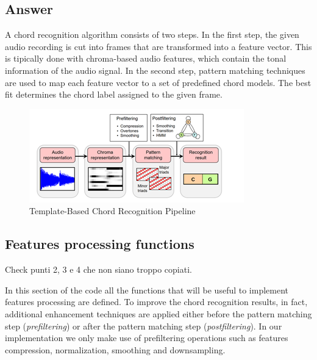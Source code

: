 \documentclass[
	12pt, %
]{fphw}
\begin{document}
\subsection*{\color{blue}Answer}

A chord recognition algorithm consists of two steps. In the first step, the given audio recording is cut into frames that are transformed into a feature vector. This is tipically done with chroma-based audio features, which contain the tonal information of the audio signal.
In the second step, pattern matching techniques are used to map each feature vector to a set of predefined chord models. The best fit determines the chord label assigned to the given frame.

\begin{figure}[H]
 \centering
 \includegraphics[scale=1]{./images/1_template_based_pipeline.png}
 \caption{Template-Based Chord Recognition Pipeline}
\end{figure}


\subsection*{Features processing functions}

\color{red}
Check punti 2, 3 e 4 che non siano troppo copiati.
\color{black}

In this section of the code all the functions that will be useful to implement features processing are defined. To improve the chord recognition results, in fact, additional enhancement techniques are applied either before the pattern matching step (\emph{prefiltering}) or after the pattern matching step (\emph{postfiltering}). In our implementation we only make use of prefiltering operations such as features compression, normalization, smoothing and downsampling.
\end{document}
